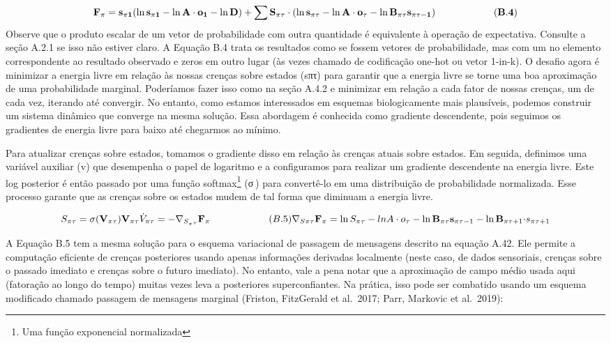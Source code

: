 \documentclass[
  12pt,
]{book}
\begin{document}
\[\bf F_\pi = \mathbf s_{\pi1}(\ln \mathbf s_{\pi1} - \ln \mathbf A\cdot o_1-\ln \mathbf D)+ \sum S_{\pi\tau} \cdot (\ln \mathbf s_{\pi\tau} - \ln \mathbf A \cdot o_{\tau} - \ln \mathbf B_{\pi\tau}\mathbf s_{\pi\tau-1} )\qquad\qquad\qquad(B.4)  \]
Observe que o produto escalar de um vetor de probabilidade com outra quantidade é equivalente à operação de expectativa. Consulte a seção A.2.1 se isso não estiver claro. A Equação B.4 trata os resultados como se fossem vetores de probabilidade, mas com um no elemento correspondente ao resultado observado e zeros em outro lugar (às vezes chamado de codificação one-hot ou vetor 1-in-k). O desafio agora é minimizar a energia livre em relação às nossas crenças sobre estados (sπτ) para garantir que a energia livre se torne uma boa aproximação de uma probabilidade marginal. Poderíamos fazer isso como na seção A.4.2 e minimizar em relação a cada fator de nossas crenças, um de cada vez, iterando até convergir. No entanto, como estamos interessados em esquemas biologicamente mais plausíveis, podemos construir um sistema dinâmico que converge na mesma solução. Essa abordagem é conhecida como gradiente descendente, pois seguimos os gradientes de energia livre para baixo até chegarmos ao mínimo.

Para atualizar crenças sobre estados, tomamos o gradiente disso em relação às crenças atuais sobre estados. Em seguida, definimos uma variável auxiliar (v) que desempenha o papel de logaritmo e a configuramos para realizar um gradiente descendente na energia livre. Este log posterior é então passado por uma função softmax\footnote{Uma função exponencial normalizada} (σ ) para convertê-lo em uma distribuição de probabilidade normalizada. Esse processo garante que as crenças sobre os estados mudem de tal forma que diminuam a energia livre.

\[ S_{\pi\tau} = \sigma(\mathbf V_{\pi\tau}) \mathbf V_{\pi\tau} \\
 \dot V_{\pi\tau} = - \nabla_{S_{_\pi\tau}}\mathbf F_\pi \qquad\qquad\qquad  (B.5) \\ 
 \nabla_{S{\pi\tau}}\mathbf F_\pi = \ln S_{\pi\tau} - ln A \cdot o_\tau - \ln \mathbf B_{\pi\tau}\mathbf s_{\pi\tau-1}- \ln \mathbf B_{\pi\tau+1}\mathbf \cdot s_{\pi\tau+1}\]

A Equação B.5 tem a mesma solução para o esquema variacional de passagem de mensagens descrito na equação A.42. Ele permite a computação eficiente de crenças posteriores usando apenas informações derivadas localmente (neste caso, de dados sensoriais, crenças sobre o passado imediato e crenças sobre o futuro imediato). No entanto, vale a pena notar que a aproximação de campo médio usada aqui (fatoração ao longo do tempo) muitas vezes leva a posteriores superconfiantes. Na prática, isso pode ser combatido usando um esquema modificado chamado passagem de mensagens marginal (Friston, FitzGerald et al.~2017; Parr, Markovic et al.~2019):
\end{document}
